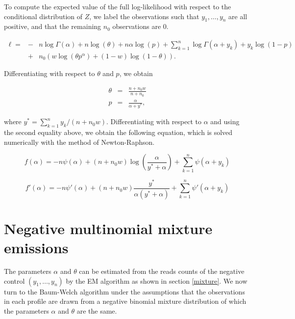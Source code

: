 \documentclass[12pt]{article}
\begin{document}
\begin{appendices}
    To compute the expected value of the full log-likelihood with
    respect to the conditional distribution of $Z$, we label the
    observations such that $y_1, \ldots, y_n$ are all positive, and
    that the remaining $n_0$ observations are 0.

    \begin{eqnarray*}
      \ell = &-&n \log \Gamma(\alpha) + n\log (\theta) +
      n \alpha \log(p) +
      \sum_{k=1}^n \log \Gamma(\alpha + y_k) + y_k \log (1-p) \\
      &+& n_0 \left( w \log(\theta p^{\alpha}) +
    (1-w) \log(1-\theta) \right).
    \end{eqnarray*}

    Differentiating with respect to $\theta$ and $p$, we obtain

    \begin{eqnarray*}
      \theta &=& \frac{n+n_0w}{n+n_0} \\
      p &=& \frac{\alpha}{\alpha + y^*}, 
    \end{eqnarray*}

    \noindent
    where $y^* = \sum_{k=1}^ny_k/(n+n_0w)$.
    Differentiating with respect to $\alpha$ and using the second
    equality above, we obtain the following equation, which is solved
    numerically with the method of Newton-Raphson.

    \begin{equation}
      f(\alpha) = -n \psi(\alpha) + (n+n_0w) \log \left(\frac{\alpha}{y^*
      + \alpha} \right) + \sum_{k=1}^n \psi(\alpha + y_k)
    \end{equation}

    \begin{equation}
      f'(\alpha) = -n \psi'(\alpha) + (n+n_0w)
      \frac{y^*}{\alpha(y^*+\alpha)} + \sum_{k=1}^n \psi'(\alpha + y_k)
    \end{equation}

    \section{Negative multinomial mixture emissions}

    The parameters $\alpha$ and $\theta$ can be estimated from the
    reads counts of the negative control $(y_1, \ldots, y_n)$ by
    the EM algorithm as shown in section \ref{mixture}. We now
    turn to the Baum-Welch algorithm under the assumptions that
    the observations in each profile are drawn from a negative
    binomial mixture distribution of which the parameters $\alpha$
    and $\theta$ are the same.


\end{appendices}
\end{document}
